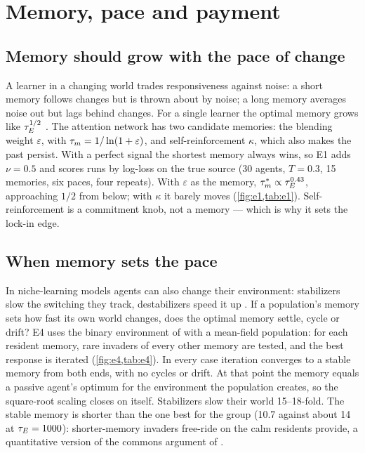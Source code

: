 \section{Memory, pace and payment}\label{sec:memory}

\subsection{Memory should grow with the pace of change}
A learner in a changing world trades responsiveness against noise: a short memory follows changes but is thrown about by
noise; a long memory averages noise out but lags behind changes. For a single learner the optimal memory grows like
$\tau_E^{1/2}$ \citep{lee2024constructing}. The attention network has two candidate memories: the blending weight
$\varepsilon$, with $\tau_m=1/\ln(1+\varepsilon)$, and self-reinforcement $\kappa$, which also makes the past persist. With a
perfect signal the shortest memory always wins, so E1 adds $\nu=0.5$ and scores runs by log-loss on the true source
(30 agents, $T=0.3$, 15 memories, six paces, four repeats). With $\varepsilon$ as the memory, $\tau_m^*\propto\tau_E^{0.43}$,
approaching $1/2$ from below; with $\kappa$ it barely moves (\cref{fig:e1,tab:e1}). Self-reinforcement is a commitment
knob, not a memory --- which is why it sets the lock-in edge.


\begin{table}[tbp]\centering\small\caption{E1: optimal memory per pace.}\label{tab:e1}\end{table}

\subsection{When memory sets the pace}
In niche-learning models agents can also change their environment: stabilizers slow the switching they track,
destabilizers speed it up \citep{lee2024constructing}. If a population's memory sets how fast its own world changes,
does the optimal memory settle, cycle or drift? E4 uses the binary environment of \citet{lee2024constructing} with a
mean-field population: for each resident memory, rare invaders of every other memory are tested, and the best response
is iterated (\cref{fig:e4,tab:e4}). In every case iteration converges to a stable memory from both ends, with no cycles or
drift. At that point the memory equals a passive agent's optimum for the environment the population creates, so the
square-root scaling closes on itself. Stabilizers slow their world 15--18-fold. The stable memory is shorter than the one
best for the group (10.7 against about 14 at $\tau_E=1000$): shorter-memory invaders free-ride on the calm residents
provide, a quantitative version of the commons argument of \citet{lee2024constructing}.

